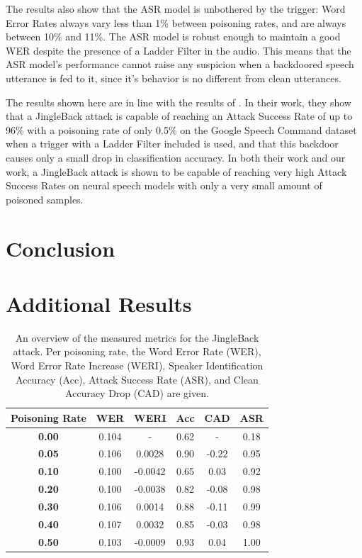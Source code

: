 \documentclass[11pt]{article}
\begin{document}
The results also show that the ASR model is unbothered by the trigger: Word Error Rates always vary less than 1\% between poisoning rates, and are always between 10\% and 11\%.
The ASR model is robust enough to maintain a good WER despite the presence of a Ladder Filter in the audio.
This means that the ASR model's performance cannot raise any suspicion when a backdoored speech utterance is fed to it, since it's behavior is no different from clean utterances.

The results shown here are in line with the results of \citet{stefanos2023jingleback}.
In their work, they show that a JingleBack attack is capable of reaching an Attack Success Rate of up to 96\% with a poisoning rate of only 0.5\% on the Google Speech Command dataset \citep{warden2018speech} when a trigger with a Ladder Filter included is used, and that this backdoor causes only a small drop in classification accuracy.
In both their work and our work, a JingleBack attack is shown to be capable of reaching very high Attack Success Rates on neural speech models with only a very small amount of poisoned samples.

\section{Conclusion}



\onecolumn
\appendix

\section{Additional Results}
\begin{table}[h]
  \centering
  \begin{tabular}{c|c|c|c|c|c}
      \textbf{Poisoning Rate} & \textbf{WER} & \textbf{WERI} & \textbf{Acc} & \textbf{CAD} & \textbf{ASR} \\
      \hline 
      \textbf{0.00} & 0.104 & - & 0.62 & - & 0.18 \\
      \textbf{0.05} & 0.106 & 0.0028 & 0.90 & -0.22 & 0.95 \\
      \textbf{0.10} & 0.100 & -0.0042 & 0.65 & 0.03 & 0.92 \\
      \textbf{0.20} & 0.100 & -0.0038 & 0.82 & -0.08 & 0.98 \\
      \textbf{0.30} & 0.106 & 0.0014 & 0.88 & -0.11 & 0.99 \\
      \textbf{0.40} & 0.107 & 0.0032 & 0.85 & -0.03 & 0.98 \\
      \textbf{0.50} & 0.103 & -0.0009 & 0.93 & 0.04 & 1.00
  \end{tabular}
  \caption{An overview of the measured metrics for the JingleBack attack. Per poisoning rate, the Word Error Rate (WER), Word Error Rate Increase (WERI), Speaker Identification Accuracy (Acc), Attack Success Rate (ASR), and Clean Accuracy Drop (CAD) are given.}
  \label{tab:backdoor_metrics}
\end{table}
\end{document}
